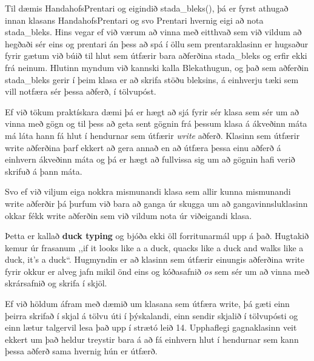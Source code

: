 Til dæmis HandahofsPrentari og eigindið stada\_bleks(), þá er fyrst athugað innan klasans HandahofsPrentari og svo Prentari hvernig eigi að nota stada\_bleks.
Hins vegar ef við værum að vinna með eitthvað sem við vildum að hegðaði sér eins og prentari án þess að spá í öllu sem prentaraklasinn er hugsaður fyrir gætum við búið til hlut sem útfærir bara aðferðina stada\_bleks og erfir ekki frá neinum.
Hlutinn myndum við kannski kalla Blekathugun, og það sem aðferðin stada\_bleks gerir í þeim klasa er að skrifa stöðu bleksins, á einhverju tæki sem vill notfæra sér þessa aðferð, í tölvupóst.

Ef við tökum praktískara dæmi þá er hægt að sjá fyrir sér klasa sem sér um að vinna með gögn og til þess að geta sent gögnin frá þessum klasa á ákveðinn máta má láta hann fá hlut í hendurnar sem útfærir \textit{write} aðferð.
Klasinn sem útfærir write aðferðina þarf ekkert að gera annað en að útfæra þessa einu aðferð á einhvern ákveðinn máta og þá er hægt að fullvissa sig um að gögnin hafi verið skrifuð á þann máta.

Svo ef við viljum eiga nokkra mismunandi klasa sem allir kunna mismunandi write aðferðir þá þurfum við bara að ganga úr skugga um að gangavinnsluklasinn okkar fékk write aðferðin sem við vildum nota úr viðeigandi klasa.

Þetta er kallað \textbf{duck typing} og bjóða ekki öll forritunarmál upp á það.
Hugtakið kemur úr frasanum ,,if it looks like a a duck, quacks like a duck and walks like a duck, it's a duck“.
Hugmyndin er að klasinn sem útfærir einungis aðferðina write fyrir okkur er alveg jafn mikil önd eins og kóðasafnið \textit{os} sem sér um að vinna með skrársafnið og skrifa í skjöl.

Ef við höldum áfram með dæmið um klasana sem útfæra write, þá gæti einn þeirra skrifað í skjal á tölvu úti í þýskalandi, einn sendir skjalið í tölvupósti og einn lætur talgervil lesa það upp í strætó leið 14.
Upphaflegi gagnaklasinn veit ekkert um það heldur treystir bara á að fá einhvern hlut í hendurnar sem kann þessa aðferð sama hvernig hún er útfærð.

\newpage
